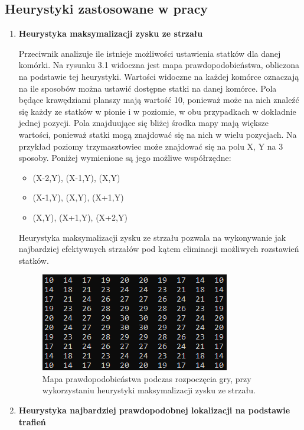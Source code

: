 \subsection{Heurystyki zastosowane w pracy}
\begin{enumerate}
  \item \textbf{Heurystyka maksymalizacji zysku ze strzału}
  
   Przeciwnik analizuje ile istnieje możliwości ustawienia statków dla danej komórki. Na rysunku 3.1 widoczna jest mapa prawdopodobieństwa, obliczona na podstawie tej heurystyki. Wartości widoczne na każdej komórce oznaczają na ile sposobów można ustawić dostępne statki na danej komórce. Pola będące krawędziami planszy mają wartość 10, ponieważ może na nich znaleźć się każdy ze statków w pionie i w poziomie, w obu przypadkach w dokładnie jednej pozycji. Pola znajduujące się bliżej środka mapy mają większe wartości, ponieważ statki mogą znajdować się na nich w wielu pozycjach. Na przykład poziomy trzymasztowiec może znajdować się na polu X, Y na 3 sposoby. Poniżej wymienione są jego możliwe współrzędne:
  \begin{itemize}
      \item (X-2,Y), (X-1,Y), (X,Y)
      \item (X-1,Y), (X,Y), (X+1,Y)
      \item (X,Y), (X+1,Y), (X+2,Y)
  \end{itemize}

  Heurystyka maksymalizacji zysku ze strzału pozwala na wykonywanie jak najbardziej efektywnych strzałów pod kątem eliminacji możliwych rozstawień statków.
  
  
  \begin{figure}[!h]
    \label{fig:mapa-prawdopodobienstwa-heurystyka-max-zysku}
    \centering \includegraphics[width=0.5\linewidth]{img/probabilityMapStart.PNG}
    \caption{Mapa prawdopodobieństwa podczas rozpoczęcia gry, przy wykorzystaniu heurystyki maksymalizacji zysku ze strzału.}
\end{figure}
  
  \item \textbf{Heurystyka najbardziej prawdopodobnej lokalizacji na podstawie trafień}


\end{enumerate}
